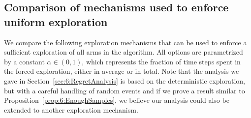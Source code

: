\subsection{Comparison of mechanisms used to enforce uniform exploration}\label{sec:6:exploringDifferentForcedExplorationMechanisms}

%

We compare the following exploration mechanisms that can be used to enforce a sufficient exploration of all arms in the \GLRklUCB{} algorithm.
All options are parametrized by a constant $\alpha\in(0,1)$, which represents the fraction of time steps spent in the forced exploration, either in average or in total.
%
Note that the analysis we gave in Section~\ref{sec:6:RegretAnalysis} is based on the deterministic exploration, but with a careful handling of random events and if we prove a result similar to Proposition~\ref{prop:6:EnoughSamples}, we believe our analysis could also be extended to another exploration mechanism.

